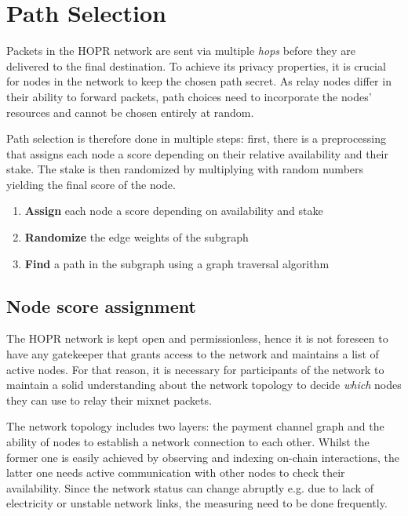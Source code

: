 \setlength{\parindent}{0pt}

\section{Path Selection}
\label{sec:path-selection}

Packets in the HOPR network are sent via multiple \textit{hops} before they are delivered to the final destination. To achieve its privacy properties, it is crucial for nodes in the network to keep the chosen path secret. As relay nodes differ in their ability to forward packets, path choices need to incorporate the nodes' resources and cannot be chosen entirely at random.

Path selection is therefore done in multiple steps: first, there is a preprocessing that assigns each node a score depending on their relative availability and their stake. The stake is then randomized by multiplying with random numbers yielding the final score of the node.

\begin{enumerate}
    \item \textbf{Assign} each node a score depending on availability and stake
    \item \textbf{Randomize} the edge weights of the subgraph
    \item \textbf{Find} a path in the subgraph using a graph traversal algorithm
\end{enumerate}

\subsection{Node score assignment}
\label{sec:path-selection:pre-selection}

The HOPR network is kept open and permissionless, hence it is not foreseen to have any gatekeeper that grants access to the network and maintains a list of active nodes. For that reason, it is necessary for participants of the network to maintain a solid understanding about the network topology to decide \textit{which} nodes they can use to relay their mixnet packets.

The network topology includes two layers: the payment channel graph and the ability of nodes to establish a network connection to each other. Whilst the former one is easily achieved by observing and indexing on-chain interactions, the latter one needs active communication with other nodes to check their availability. Since the network status can change abruptly e.g. due to lack of electricity or unstable network links, the measuring need to be done frequently.

